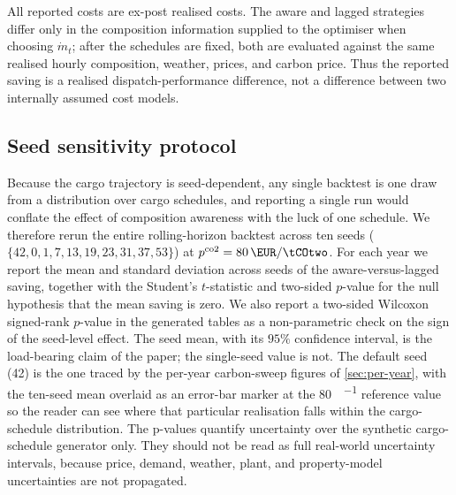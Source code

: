 \documentclass[11pt]{article}
\begin{document}
All reported costs are ex-post realised costs. The aware and lagged strategies
differ only in the composition information supplied to the optimiser when
choosing $\dot m_t$; after the schedules are fixed, both are evaluated against
the same realised hourly composition, weather, prices, and carbon price. Thus
the reported saving is a realised dispatch-performance difference, not a
difference between two internally assumed cost models.

\subsection{Seed sensitivity protocol}
\label{sec:seed-protocol}

Because the cargo trajectory is seed-dependent, any single backtest is one
draw from a distribution over cargo schedules, and reporting a single run
would conflate the effect of composition awareness with the luck of one
schedule. We therefore rerun the entire rolling-horizon backtest across ten
seeds ($\{42, 0, 1, 7, 13, 19, 23, 31, 37, 53\}$) at
$p^{\text{co2}}=\SI{80}{\EUR\per\tCOtwo}$. For each year we report the mean
and standard deviation across seeds of the aware-versus-lagged saving,
together with the Student's $t$-statistic and two-sided $p$-value for the
null hypothesis that the mean saving is zero. We also report a two-sided
Wilcoxon signed-rank $p$-value in the generated tables as a non-parametric
check on the sign of the seed-level effect. The seed mean, with its
$95\%$ confidence interval, is the load-bearing claim of the paper; the
single-seed value is not. The default seed (42) is the one traced by the
per-year carbon-sweep figures of \cref{sec:per-year}, with the ten-seed mean
overlaid as an error-bar marker at the \SI{80}{\EUR\per\tCOtwo} reference value so the reader can see
where that particular realisation falls within the cargo-schedule
distribution.
The p-values quantify uncertainty over the synthetic cargo-schedule generator
only. They should not be read as full real-world uncertainty intervals, because
price, demand, weather, plant, and property-model uncertainties are not
propagated.
\end{document}
